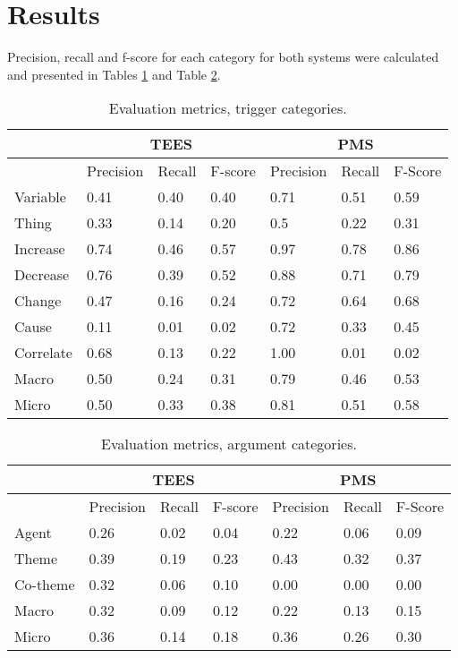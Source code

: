 \section{Results}

Precision, recall and f-score for each category for both systems were calculated and presented in Tables \ref{trigger_ev} and Table \ref{argument_ev}. 

\begin{table}
\begin{center}
\begin{tabular}{ | l | l | l | l | l | l | l | }
	\hline
	\cellcolor{gray} & \multicolumn{3}{c}{TEES} & \multicolumn{3}{c|}{PMS} \\ \hline
	\cellcolor{gray} & Precision & Recall & F-score & Precision & Recall & F-Score \\ \hline
	Variable & 0.41 & 0.40 & 0.40 & 0.71 & 0.51 & 0.59 \\
	Thing & 0.33 & 0.14 & 0.20 & 0.5 & 0.22 & 0.31 \\
	Increase & 0.74 & 0.46 & 0.57 & 0.97 & 0.78 & 0.86 \\
	Decrease & 0.76 & 0.39 & 0.52 & 0.88 & 0.71 & 0.79 \\ 
	Change & 0.47 & 0.16 & 0.24 & 0.72 & 0.64 & 0.68 \\ 
	Cause & 0.11 & 0.01 & 0.02 & 0.72 & 0.33 & 0.45 \\ 
	Correlate & 0.68 & 0.13 & 0.22 & 1.00 & 0.01 & 0.02 \\ \hline
	Macro & 0.50 & 0.24 & 0.31 & 0.79 & 0.46 & 0.53 \\
	Micro & 0.50 & 0.33 & 0.38 & 0.81 & 0.51 & 0.58 \\ \hline
\end{tabular}
\end{center}
\caption{Evaluation metrics, trigger categories.}
\label{trigger_ev}
\end{table}

\begin{table}
\begin{center}
\begin{tabular}{ | l | l | l | l | l | l | l | }	
	\hline
	\cellcolor{gray} & \multicolumn{3}{c}{TEES} & \multicolumn{3}{c|}{PMS} \\ \hline
	\cellcolor{gray} & Precision & Recall & F-score & Precision & Recall & F-Score \\ \hline
	Agent & 0.26 & 0.02 & 0.04 & 0.22 & 0.06 & 0.09 \\
	Theme & 0.39 & 0.19 & 0.23 & 0.43 & 0.32 & 0.37 \\
	Co-theme & 0.32 & 0.06 & 0.10 & 0.00 & 0.00 & 0.00 \\ \hline
	Macro & 0.32 & 0.09 & 0.12 & 0.22 & 0.13 & 0.15 \\ 
	Micro & 0.36 & 0.14 & 0.18 & 0.36 & 0.26 & 0.30 \\ \hline
\end{tabular}
\end{center}
\caption{Evaluation metrics, argument categories.}
\label{argument_ev}
\end{table}

